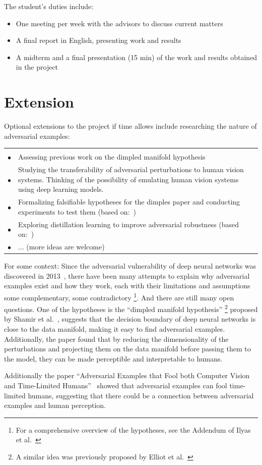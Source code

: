 \documentclass[a4paper,11pt]{article}
\newenvironment{reqlist}{\par \medskip \noindent \begin{tabular}{cp{0.83\textwidth}r} \\[-24pt]}{\end{tabular}}
\newcommand\req{\\ \smallskip \smallskip \hspace{0.24cm} $\bullet$\hspace{-0.2cm} & }
\begin{document}
\medskip

The student's duties include:

\begin{itemize}
	\item One meeting per week with the advisors to discuss current matters
	\item A final report in English, presenting work and results
	\item A midterm and a final presentation (15 min) of the work and results obtained in the project
\end{itemize}

\section*{Extension}

Optional extensions to the project if time allows include researching the nature of adversarial examples:

\begin{reqlist}
    \req Assessing previous work on the dimpled manifold hypothesis
    \req Studying the transferability of adversarial perturbations to human vision systems. Thinking of the possibility of emulating human vision systems using deep learning models.
    \req Formalizing falsifiable hypotheses for the dimples paper and conducting experiments to test them (based on:~\cite{kilcher2021dimpled, kilcher2021dimpledcode, karner2023dimpled})
    \req Exploring distillation learning to improve adversarial robustness (based on:~\cite{papernot2016distillation, madry2017towards})
    \req ... (more ideas are welcome)
\end{reqlist}

For some context: Since the adversarial vulnerability of deep neural networks was discovered in 2013~\cite{goodfellow2014explaining}, there have been many attempts to explain why adversarial examples exist and how they work, each with their limitations and assumptions \textendash{} some complementary, some contradictory \footnote{For a comprehensive overview of the hypotheses, see the Addendum of Ilyas et al.~\cite{ilyas2019adversarial}}. And there are still many open questions. One of the hypotheses is the ``dimpled manifold hypothesis'' \footnote{A similar idea was previously proposed by Elliot et al.~\cite{elliott2021explaining}} proposed by Shamir et al.~\cite{shamir2021dimpled}, suggests that the decision boundary of deep neural networks is close to the data manifold, making it easy to find adversarial examples. Additionally, the paper found that by reducing the dimensionality of the perturbations and projecting them on the data manifold before passing them to the model, they can be made perceptible and interpretable to humans. 

\bigskip

Additionally the paper ``Adversarial Examples that Fool both Computer Vision and Time-Limited Humans''~\cite{elsayed2018adversarial} showed that adversarial examples can fool time-limited humans, suggesting that there could be a connection between adversarial examples and human perception.



\end{document}
